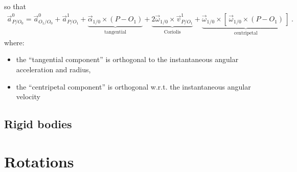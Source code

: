 \documentclass[letterpaper,10pt,english]{jupyterBook}
\begin{document}
\sphinxAtStartPar
so that
\begin{equation}\label{equation:ch/kinematics-relative:eq:relative:point:acc}
\begin{split}
\vec{a}^0_{P/O_0} = \vec{a}^0_{O_1/O_0} + \vec{a}^{1}_{P/O_1} + \underbrace{\vec{\alpha}_{1/0} \times (P - O_1)}_{\text{tangential}} + \underbrace{2 \vec{\omega}_{1/0} \times \vec{v}^1_{P/O_1}}_{\text{Coriolis}} + \underbrace{\vec{\omega}_{1/0} \times [ \, \vec{\omega}_{1/0} \times (P - O_1) \, ]}_{\text{centripetal}} \ .
\end{split}
\end{equation}
\sphinxAtStartPar
where:
\begin{itemize}
\item {} 
\sphinxAtStartPar
the “tangential component” is orthogonal to the instantaneous angular acceleration and radius,

\item {} 
\sphinxAtStartPar
the “centripetal component” is orthogonal w.r.t. the instantaneous angular velocity

\end{itemize}

\sphinxAtStartPar
{}  


\subsection{Rigid bodies}
\label{\detokenize{ch/kinematics-relative:rigid-bodies}}
\sphinxAtStartPar
{}

\sphinxAtStartPar
{}

\sphinxAtStartPar
{}

\sphinxstepscope


\section{Rotations}
\label{\detokenize{ch/kinematics-rotations:rotations}}\label{\detokenize{ch/kinematics-rotations:classical-mechanics-kinematics-rotations}}\label{\detokenize{ch/kinematics-rotations::doc}}
\end{document}
